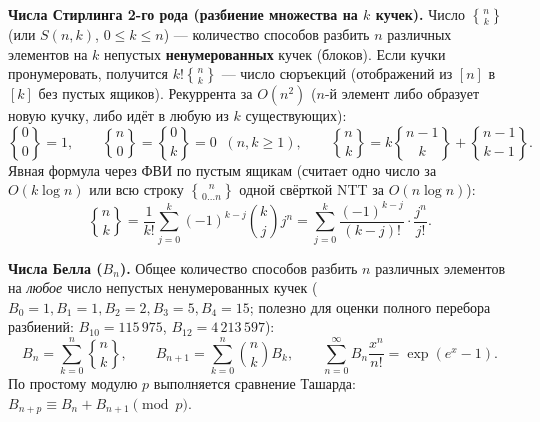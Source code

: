 \documentclass[10pt,a4paper]{article}
\renewcommand{\le}{\leqslant}
\renewcommand{\ge}{\geqslant}
\newcommand{\stirlingsecond}[2]{\genfrac{\{}{\}}{0pt}{}{#1}{#2}}
\begin{document}
\textbf{Числа Стирлинга 2-го рода (разбиение множества на $k$ кучек).} Число $\stirlingsecond{n}{k}$ (или $S(n, k)$, $0 \le k \le n$) — количество способов разбить $n$ различных элементов на $k$ непустых \textbf{ненумерованных} кучек (блоков). Если кучки пронумеровать, получится $k! \stirlingsecond{n}{k}$ — число сюръекций (отображений из $[n]$ в $[k]$ без пустых ящиков). Рекуррента за $O(n^2)$ ($n$-й элемент либо образует новую кучку, либо идёт в любую из $k$ существующих):
\[
  \stirlingsecond{0}{0} = 1, \qquad \stirlingsecond{n}{0} = \stirlingsecond{0}{k} = 0 \;\;(n, k \ge 1), \qquad
  \stirlingsecond{n}{k} = k\stirlingsecond{n - 1}{k} + \stirlingsecond{n - 1}{k - 1}.
\]
Явная формула через ФВИ по пустым ящикам (считает одно число за $O(k \log n)$ или всю строку $\stirlingsecond{n}{0 \dots n}$ одной свёрткой NTT за $O(n \log n)$):
\[
  \stirlingsecond{n}{k} = \frac{1}{k!} \sum_{j=0}^{k} (-1)^{k - j} \binom{k}{j} j^n = \sum_{j=0}^{k} \frac{(-1)^{k - j}}{(k - j)!} \cdot \frac{j^n}{j!}.
\]

\textbf{Числа Белла ($B_n$).} Общее количество способов разбить $n$ различных элементов на \emph{любое} число непустых ненумерованных кучек ($B_0 = 1, B_1 = 1, B_2 = 2, B_3 = 5, B_4 = 15$; полезно для оценки полного перебора разбиений: $B_{10} = 115\,975$, $B_{12} = 4\,213\,597$):
\[
  B_n = \sum_{k=0}^{n} \stirlingsecond{n}{k}, \qquad
  B_{n + 1} = \sum_{k=0}^{n} \binom{n}{k} B_k, \qquad
  \sum_{n=0}^{\infty} B_n \frac{x^n}{n!} = \exp(e^x - 1).
\]
По простому модулю $p$ выполняется сравнение Ташарда: $B_{n + p} \equiv B_n + B_{n + 1} \pmod p$.
\end{document}
